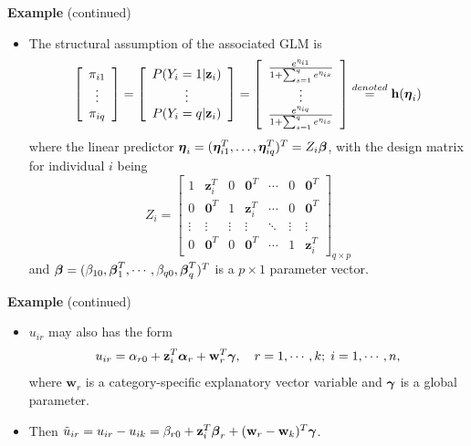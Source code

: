 \documentclass{beamer}
\newenvironment{wideitemize}%
  {\begin{itemize}%
    \setlength{\parskip}{1em}}%
  {\end{itemize}}
\begin{document}
\begin{frame}{}
\textbf{Example} (continued)
\begin{itemize}
\item
The structural assumption of the associated GLM is
$$\left[\begin{array}{c}\pi_{i1} \\ \vdots \\ \pi_{iq}\end{array}\right]=\left[\begin{array}{c}
P(Y_i=1|\textbf{z}_i) \\ \vdots \\ P(Y_i=q|\textbf{z}_i)\end{array}\right]=
\left[\begin{array}{c} \frac{e^{\eta_{i1}}}{1+\sum_{s=1}^q e^{\eta_{is}}} \\ \vdots \\ 
\frac{e^{\eta_{iq}}}{1+\sum_{s=1}^q e^{\eta_{is}}} \end{array}\right]\stackrel{denoted}{=}
\textbf{h}(\mbox{\boldmath $\eta$}_i)$$
where the linear predictor $\mbox{\boldmath $\eta$}_i= ({\boldsymbol \eta}^T_{i1}, \dots, {\boldsymbol \eta}^T_{iq})^T= Z_i\mbox{\boldmath $\beta$}$, 
with the design matrix for individual $i$ being
$$Z_i=\left[\begin{array}{ccccccc}1 & \textbf{z}_i^T & 0 & \textbf{0}^T & \cdots & 0 & \textbf{0}^T \\ 
0 & \textbf{0}^T & 1 & \textbf{z}_i^T & \cdots & 0 & \textbf{0}^T \\
\vdots & \vdots & \vdots & \vdots & \ddots & \vdots & \vdots \\ 0 & \textbf{0}^T & 0 & \textbf{0}^T & 
\cdots & 1 & \textbf{z}_i^T\end{array} \right]_{q\times p}$$
and $\mbox{\boldmath $\beta$}=(\beta_{10}, \mbox{\boldmath $\beta$}_1^T, \cdots, 
\beta_{q0}, \mbox{\boldmath $\beta$}_q^T)^T$ is a $p\times 1$ parameter vector.
\end{itemize}
\end{frame}



\begin{frame}{}
\textbf{Example} (continued)
\begin{wideitemize}
\item
$u_{ir}$ may also has  the form
$$u_{ir}=\alpha_{r0}+\textbf{z}_i^T\mbox{\boldmath $\alpha$}_r+\textbf{w}_r^T\mbox{\boldmath $\gamma$},
\quad r=1,\cdots, k; \; i=1,\cdots,n,
$$
where $\textbf{w}_r$ is a category-specific explanatory vector variable and $\mbox{\boldmath $\gamma$}$
is a global parameter.  

%


\item
Then $\tilde{u}_{ir}=u_{ir}-u_{ik}=\beta_{r0}+\textbf{z}_i^T\mbox{\boldmath $\beta$}_r+(\textbf{w}_r
-\textbf{w}_k)^T\mbox{\boldmath $\gamma$}$.

\end{wideitemize}
\end{frame}
\end{document}
